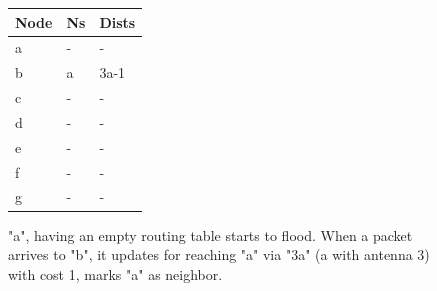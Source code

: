 \documentclass[12pt, oneandhalf, chaparabic, sees, ms]{metu}
\begin{document}
\begin{center}
\begin{figure}[!htp]
\begin{center}
\begin{minipage}{.7\textwidth}
\begin{tikzpicture}[scale=1.5, auto,swap]
   \end{tikzpicture}
   \end{minipage}%
   \hfill
    \noindent \begin{minipage}{0.3\textwidth}
    \begin{tabular}{ | l | l | l | }
    \hline
    \rowcolor{lightgray}
    Node & Ns & Dists \\ \hline \hline
    a    & -  & -  \\ \hline
     \rowcolor{black!50}
    b    & a  & 3a-1   \\ \hline
    c    & -  & -     \\ \hline
    d    & -  & -     \\ \hline
    e    & -  & -     \\ \hline
    f    & -  & -     \\ \hline
    g    & -  & -     \\
    \hline
   \end{tabular}
   \end{minipage}
   
   \end{center}
    \caption{"a", having an empty routing table starts to flood. 
    When a packet arrives to "b", it updates for reaching "a" via "3a" (a with antenna 3) with cost 1, marks "a" as neighbor.}
    \label{fig:lagoon-graph2d}
  \end{figure}
\end{center}
  
 
 
 
 
\end{document}
